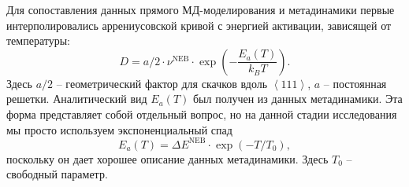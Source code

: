 \documentclass[master,14pt,subf,href,colorlinks=true
]{disser}
\begin{document}
Для сопоставления данных прямого МД-моделирования и метадинамики первые интерполировались аррениусовской кривой с энергией активации, зависящей от температуры:
\begin{equation}
D = a/2 \cdot \nu^\mathrm{NEB} \cdot \exp\left( - \frac{E_a(T)}{k_B T}\right).
\end{equation}
Здесь $a/2$ -- геометрический фактор для скачков вдоль $\left\langle 111\right\rangle$, $a$ -- постоянная решетки.
Аналитический вид $E_a(T)$ был получен из данных метадинамики. Эта форма представляет собой отдельный вопрос, но на данной стадии исследования мы просто используем экспоненциальный спад
\begin{equation}
E_a(T) = \Delta E^{\mathrm{NEB}} \cdot \exp{\left( -T/T_0\right)},
\end{equation} 
поскольку он дает хорошее описание данных метадинамики. Здесь $T_0$ -- свободный параметр.
\end{document}
